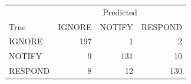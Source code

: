 \begin{tabular}{lrrr}
\toprule
 & \multicolumn{3}{c}{Predicted} \\
True & IGNORE & NOTIFY & RESPOND \\
\midrule
IGNORE & 197 & 1 & 2 \\
NOTIFY & 9 & 131 & 10 \\
RESPOND & 8 & 12 & 130 \\
\bottomrule
\end{tabular}
